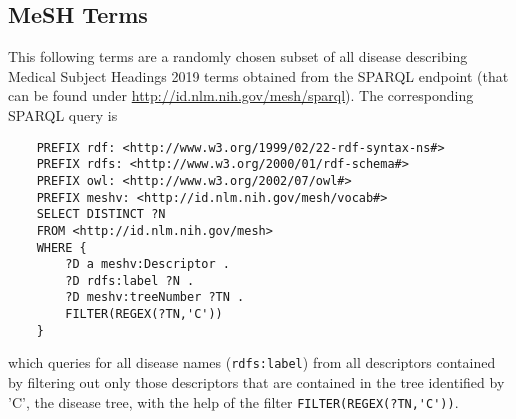 \newpage
\subsection{MeSH Terms}
\label{app:terms}

This following terms are a randomly chosen subset of all disease describing Medical Subject Headings 2019 terms obtained from the SPARQL endpoint 
(that can be found under \url{http://id.nlm.nih.gov/mesh/sparql}). The corresponding SPARQL query is
\begin{verbatim}
    PREFIX rdf: <http://www.w3.org/1999/02/22-rdf-syntax-ns#>
    PREFIX rdfs: <http://www.w3.org/2000/01/rdf-schema#>
    PREFIX owl: <http://www.w3.org/2002/07/owl#>
    PREFIX meshv: <http://id.nlm.nih.gov/mesh/vocab#>
    SELECT DISTINCT ?N
    FROM <http://id.nlm.nih.gov/mesh>
    WHERE { 
        ?D a meshv:Descriptor .
        ?D rdfs:label ?N .
        ?D meshv:treeNumber ?TN .
        FILTER(REGEX(?TN,'C'))
    }
\end{verbatim}
which queries for all disease names (\verb!rdfs:label!) from all descriptors contained by filtering out only those descriptors that are contained in the
tree identified by 'C', the disease tree, with the help of the filter \verb!FILTER(REGEX(?TN,'C'))!.

